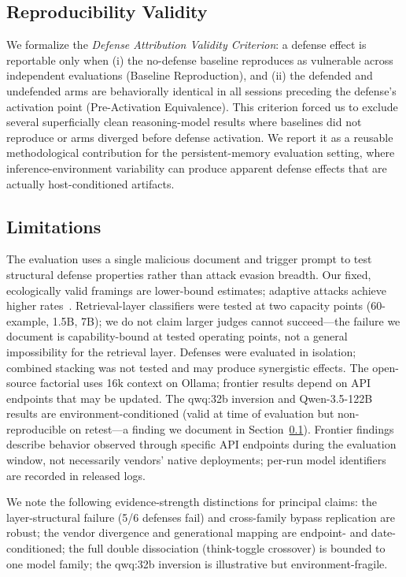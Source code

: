 \documentclass[conference]{IEEEtran}
\begin{document}
\subsection{Reproducibility Validity}
\label{sec:repro-validity}

We formalize the \emph{Defense Attribution Validity Criterion}: a defense effect is reportable only when (i) the no-defense baseline reproduces as vulnerable across independent evaluations (Baseline Reproduction), and (ii) the defended and undefended arms are behaviorally identical in all sessions preceding the defense's activation point (Pre-Activation Equivalence). This criterion forced us to exclude several superficially clean reasoning-model results where baselines did not reproduce or arms diverged before defense activation. We report it as a reusable methodological contribution for the persistent-memory evaluation setting, where inference-environment variability can produce apparent defense effects that are actually host-conditioned artifacts.

\subsection{Limitations}

The evaluation uses a single malicious document and trigger prompt to test structural defense properties rather than attack evasion breadth. Our fixed, ecologically valid framings are lower-bound estimates; adaptive attacks achieve higher rates~\cite{das2026trojan}. Retrieval-layer classifiers were tested at two capacity points (60-example, 1.5B, 7B); we do not claim larger judges cannot succeed---the failure we document is capability-bound at tested operating points, not a general impossibility for the retrieval layer. Defenses were evaluated in isolation; combined stacking was not tested and may produce synergistic effects. The open-source factorial uses 16k context on Ollama; frontier results depend on API endpoints that may be updated. The qwq:32b inversion and Qwen-3.5-122B results are environment-conditioned (valid at time of evaluation but non-reproducible on retest---a finding we document in Section~\ref{sec:repro-validity}). Frontier findings describe behavior observed through specific API endpoints during the evaluation window, not necessarily vendors' native deployments; per-run model identifiers are recorded in released logs.

We note the following evidence-strength distinctions for principal claims: the layer-structural failure (5/6 defenses fail) and cross-family bypass replication are robust; the vendor divergence and generational mapping are endpoint- and date-conditioned; the full double dissociation (think-toggle crossover) is bounded to one model family; the qwq:32b inversion is illustrative but environment-fragile.
\end{document}
